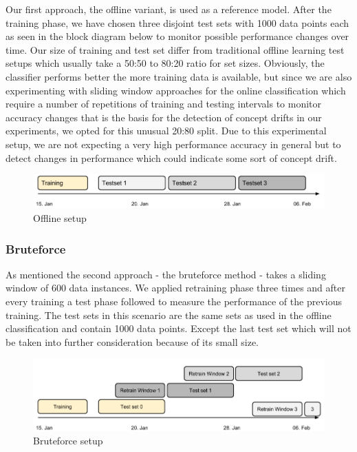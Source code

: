 \documentclass{article} %
\begin{document}
Our first approach, the offline variant, is used as a reference model. After the training phase, we have chosen three disjoint test sets with 1000 data points each as seen in the block diagram below to monitor possible performance changes over time. Our size of training and test set differ from traditional offline learning test setups which usually take a 50:50 to 80:20 ratio for set sizes. Obviously, the classifier performs better the more training data is available, but since we are also experimenting with sliding window approaches for the online classification which require a number of repetitions of training and testing intervals to monitor accuracy changes that is the basis for the detection of concept drifts in our experiments, we opted for this unusual 20:80 split. Due to this experimental setup, we are not expecting a very high performance accuracy in general but to detect changes in performance which could indicate some sort of concept drift.

\begin{figure}[htbp]
  \centering
  \includegraphics[scale=0.28]{./time_models/OfflineModel.png}
  \caption{Offline setup}
\end{figure}
\subsubsection*{Bruteforce}
As mentioned the second approach - the bruteforce method -  takes a sliding window of 600 data instances. We applied retraining phase three times and after every training a test phase followed to measure the performance of the previous training.  The test sets in this scenario are the same sets as used in the offline classification and contain 1000 data points. Except the last test set which will not be taken into further consideration because of its small size.

\begin{figure}[htbp]
  \centering
  \includegraphics[scale=0.28]{./time_models/BruteforceModel.png}
  \caption{Bruteforce setup}
\end{figure}
\end{document}

